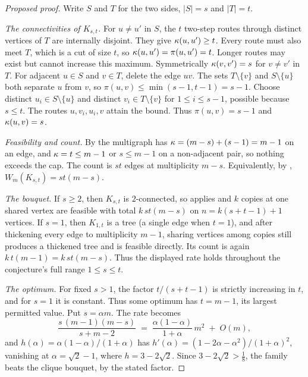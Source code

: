 \begin{proof}[Proposed proof]
Write $S$ and $T$ for the two sides, $|S| = s$ and $|T| = t$.

\emph{The connectivities of $K_{s,t}$.} For $u \ne u'$ in $S$, the $t$ two-step routes through distinct vertices of $T$ are internally disjoint. They give $\kappa(u,u') \ge t$. Every route must also meet $T$, which is a cut of size $t$, so $\kappa(u,u') = \pi(u,u') = t$. Longer routes may exist but cannot increase this maximum. Symmetrically $\kappa(v,v') = s$ for $v \ne v'$ in $T$. For adjacent $u \in S$ and $v \in T$, delete the edge $uv$. The sets $T \setminus \{v\}$ and $S \setminus \{u\}$ both separate $u$ from $v$, so $\pi(u,v) \le \min(s-1, t-1) = s-1$. Choose distinct $u_i \in S \setminus \{u\}$ and distinct $v_i \in T \setminus \{v\}$ for $1 \le i \le s-1$, possible because $s \le t$. The routes $u, v_i, u_i, v$ attain the bound. Thus $\pi(u,v) = s-1$ and $\kappa(u,v) = s$.

\emph{Feasibility and count.} By  the multigraph has $\kappa = (m-s) + (s-1) = m-1$ on an edge, and $\kappa = t \le m-1$ or $s \le m-1$ on a non-adjacent pair, so nothing exceeds the cap. The count is $st$ edges at multiplicity $m-s$. Equivalently, by , $W_m(K_{s,t}) = st(m - s)$.

\emph{The bouquet.} If $s\ge2$, then $K_{s,t}$ is $2$-connected, so  applies and $k$ copies at one shared vertex are feasible with total $k\,st(m-s)$ on $n = k(s+t-1)+1$ vertices. If $s=1$, then $K_{1,t}$ is a tree (a single edge when $t=1$), and after thickening every edge to multiplicity $m-1$, sharing vertices among copies still produces a thickened tree and is feasible directly. Its count is again $k\,t(m-1)=k\,st(m-s)$. Thus the displayed rate holds throughout the conjecture's full range $1\le s\le t$.

\emph{The optimum.} For fixed $s>1$, the factor $t/(s+t-1)$ is strictly increasing in $t$, and for $s=1$ it is constant. Thus some optimum has $t=m-1$, its largest permitted value. Put $s = \alpha m$. The rate becomes
\[
    \frac{s\,(m-1)(m-s)}{s+m-2}
    \;=\; \frac{\alpha(1-\alpha)}{1+\alpha}\,m^2 \;+\; O(m) ,
\]
and $h(\alpha) = \alpha(1-\alpha)/(1+\alpha)$ has $h'(\alpha) = (1 - 2\alpha - \alpha^2)/(1+\alpha)^2$, vanishing at $\alpha = \sqrt{2}-1$, where $h = 3 - 2\sqrt{2}$. Since $3 - 2\sqrt{2} > \tfrac18$, the family beats the clique bouquet, by the stated factor.
\end{proof}


